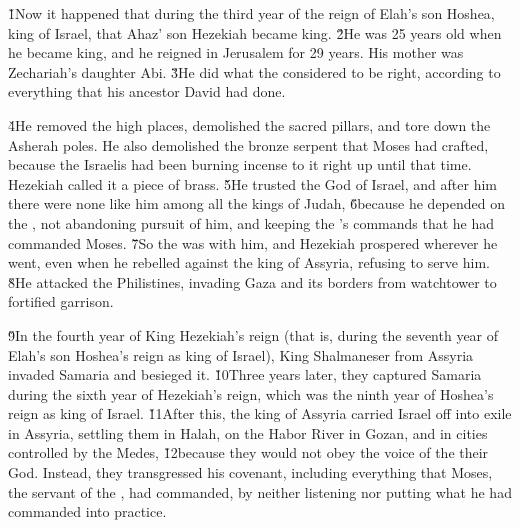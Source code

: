 \v{1}Now it happened that during the third year of the reign of Elah's son Hoshea, king of Israel, that Ahaz' son Hezekiah became king. \v{2}He was 25 years old when he became king, and he reigned in Jerusalem for 29 years. His mother was Zechariah's daughter Abi. \v{3}He did what the  considered to be right, according to everything that his ancestor David had done.

\v{4}He removed the high places, demolished the sacred pillars, and tore down the Asherah poles. He also demolished the bronze serpent that Moses had crafted, because the Israelis had been burning incense to it right up until that time. Hezekiah called it a piece of brass. \v{5}He trusted the  God of Israel, and after him there were none like him among all the kings of Judah, \v{6}because he depended on the , not abandoning pursuit of him, and keeping the 's commands that he had commanded Moses. \v{7}So the  was with him, and Hezekiah prospered wherever he went, even when he rebelled against the king of Assyria, refusing to serve him. \v{8}He attacked the Philistines, invading Gaza and its borders from watchtower to fortified garrison.

\v{9}In the fourth year of King Hezekiah's reign (that is, during the seventh year of Elah's son Hoshea's reign as king of Israel), King Shalmaneser from Assyria invaded Samaria and besieged it. \v{10}Three years later, they captured Samaria during the sixth year of Hezekiah's reign, which was the ninth year of Hoshea's reign as king of Israel. \v{11}After this, the king of Assyria carried Israel off into exile in Assyria, settling them in Halah, on the Habor River in Gozan, and in cities controlled by the Medes, \v{12}because they would not obey the voice of the  their God. Instead, they transgressed his covenant, including everything that Moses, the servant of the , had commanded, by neither listening nor putting what he had commanded into practice.


